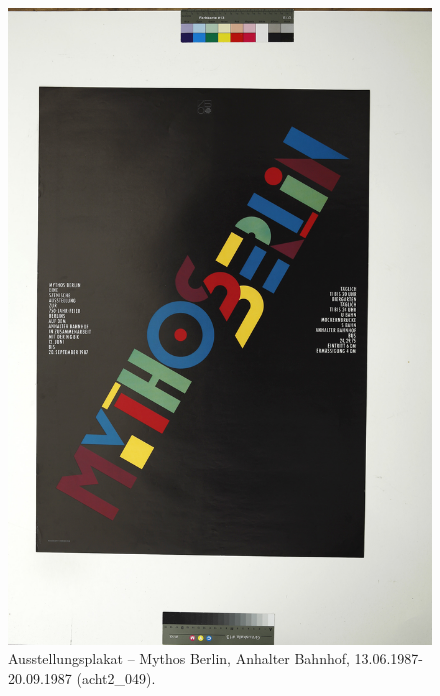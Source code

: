 \documentclass[a4paper,12pt,ngerman]{article}
\begin{document}
\newpage
\begin{figure}[ht]
\includegraphics[width=\linewidth]{Abbildung_20_(acht2_049)}
\centering
\caption{Ausstellungsplakat – Mythos Berlin, Anhalter Bahnhof, 13.06.1987-20.09.1987 (acht2\_049).}
\end{figure}
\end{document}
